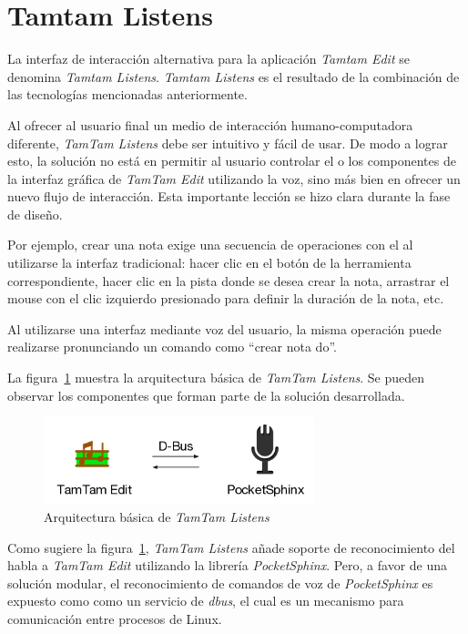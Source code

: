 \section{Tamtam Listens}
\label{sec:tamtam-listens}
La interfaz de interacci\'on alternativa para la aplicaci\'on \emph{Tamtam Edit} se denomina  
\emph{Tamtam Listens}. \emph{Tamtam Listens} es el resultado de la combinaci\'on
de las tecnolog\'ias mencionadas anteriormente.


Al ofrecer al usuario final un medio de interacci\'on humano-computadora diferente, \emph{TamTam Listens} debe
ser intuitivo y f\'acil de usar. De modo a lograr esto, la soluci\'on no est\'a en permitir al usuario controlar 
el  o los componentes de la interfaz gr\'afica de \emph{TamTam Edit} utilizando la voz, sino
m\'as bien en ofrecer un nuevo flujo de interacci\'on. Esta importante lecci\'on se hizo clara durante la fase
de dise\~no.

Por ejemplo, crear una nota exige una secuencia de operaciones con el  al utilizarse la
interfaz tradicional: hacer clic en el bot\'on de la herramienta correspondiente, hacer clic en la pista
donde se desea crear la nota, arrastrar el mouse con el clic izquierdo presionado para definir la duraci\'on
de la nota, etc.

Al utilizarse una interfaz mediante voz del usuario, la misma operaci\'on puede realizarse pronunciando un
comando como ``crear nota do''.


La figura~\ref{figure:tamtam-listens-arq} muestra la arquitectura b\'asica de \emph{TamTam Listens}. Se pueden
observar los componentes que forman parte de la soluci\'on desarrollada.

\begin{figure}[H] 
\centering
\includegraphics[width=0.7\textwidth]{./graphics/tamtam-listens-arq.png}
\caption{Arquitectura b\'asica de \emph{TamTam Listens}}
\label{figure:tamtam-listens-arq}
\end{figure}

Como sugiere la figura~\ref{figure:tamtam-listens-arq}, \emph{TamTam Listens} a\~nade soporte de reconocimiento
del habla a \emph{TamTam Edit} utilizando la librer\'ia \emph{PocketSphinx}. Pero, a favor de una soluci\'on modular,
el reconocimiento de comandos de voz de \emph{PocketSphinx} es expuesto como 
como un  servicio de \emph{dbus}\cite{Dbus2013}, el cual es
un mecanismo para comunicaci\'on entre procesos de Linux.

